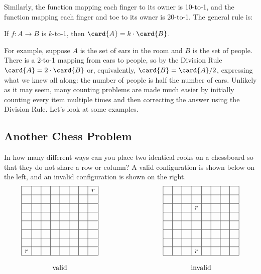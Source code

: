 Similarly, the function mapping each finger to its owner is 10-to-1, and
the function mapping each finger and toe to its owner is 20-to-1.  The
general rule is:
\begin{mathrule}
If $f : A \to B$ is $k$-to-1, then $\card{A} = k \cdot \card{B}$.
\end{mathrule}

For example, suppose $A$ is the set of ears in the room and $B$ is the set
of people.  There is a 2-to-1 mapping from ears to people, so by the
Division Rule $\card{A} = 2 \cdot \card{B}$ or, equivalently, $\card{B} =
\card{A} / 2$, expressing what we knew all along: the number of people is
half the number of ears.  Unlikely as it may seem, many counting problems
are made much easier by initially counting every item multiple times and
then correcting the answer using the Division Rule.  Let's look at some
examples.

\subsection{Another Chess Problem}

In how many different ways can you place two identical rooks on a
chessboard so that they do not share a row or column?  A valid
configuration is shown below on the left, and an invalid configuration
is shown on the right.
%
\[
\begin{array}{ccc}
\begin{array}{|c|c|c|c|c|c|c|c|}
\hline
\ &\ &\ &\ &\ &\ &\ &r \\ \hline
 & & & & & & &\ \\ \hline
 & & & & & & & \\ \hline
 & & & & & & & \\ \hline
 & & & & & & & \\ \hline
 & & & & & & & \\ \hline
 & & & & & & & \\ \hline
r& & & & & & & \\ \hline
\end{array}
& \hspace{1in} &
\begin{array}{|c|c|c|c|c|c|c|c|}
\hline
\ &\ &\ &\ &\ &\ &\ &\ \\ \hline
 & & & & & & & \\ \hline
 & & &r& & & & \\ \hline
 & & & & & & & \\ \hline
 & & & & & & & \\ \hline
 & & & & & & & \\ \hline
 & & & & & & & \\ \hline
 & & &r& & & & \\ \hline
\end{array} \\
\\
\text{valid} & & \text{invalid}
\end{array}
\]

